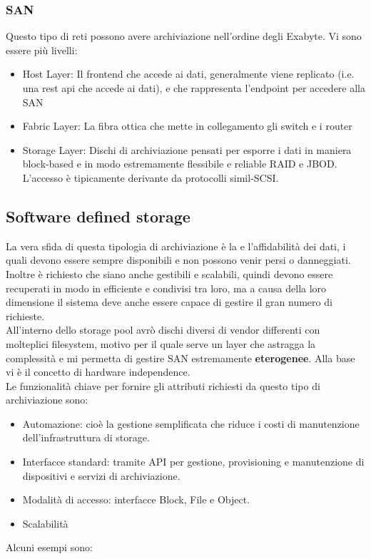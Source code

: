 \documentclass{article}
\begin{document}
		\subsubsection{SAN}
		Questo tipo di reti possono avere archiviazione nell'ordine degli Exabyte. Vi sono essere più livelli:
		\begin{itemize}
		    \item Host Layer: Il frontend che accede ai dati, generalmente viene replicato (i.e. una rest api che accede ai dati), e che rappresenta l’endpoint per accedere alla SAN
		    \item Fabric Layer: La fibra ottica che mette in collegamento gli switch e i router
		    \item Storage Layer: Dischi di archiviazione pensati per esporre i dati in maniera block-based e in modo estremamente flessibile e reliable RAID e JBOD. L’accesso è tipicamente derivante da protocolli simil-SCSI.
		\end{itemize}
		\subsection{Software defined storage}
		La vera sfida di questa tipologia di archiviazione è la  e l'affidabilità dei dati, i quali devono essere sempre disponibili e non possono venir persi o danneggiati.\\
		Inoltre è richiesto che siano anche gestibili e scalabili, quindi devono essere recuperati in modo in efficiente e condivisi tra loro, ma a causa della loro dimensione il sistema deve anche essere capace di gestire il gran numero di richieste.\\
		
		All’interno dello storage pool avrò dischi diversi di vendor differenti con molteplici filesystem, motivo per il quale serve un layer che astragga la complessità e mi permetta di gestire SAN estremamente \textbf{eterogenee}. Alla base vi è il concetto di hardware independence.\\
		Le funzionalità chiave per fornire gli attributi richiesti da questo tipo di archiviazione sono:
		\begin{itemize}
		    \item Automazione: cioè la gestione semplificata che riduce i costi di manutenzione dell'infrastruttura di storage.
		    \item Interfacce standard: tramite API per gestione, provisioning e manutenzione di dispositivi e servizi di archiviazione.
		    \item Modalità di accesso: interfacce Block, File e Object.
		    \item Scalabilità
		\end{itemize}
		Alcuni esempi sono:
\end{document}
